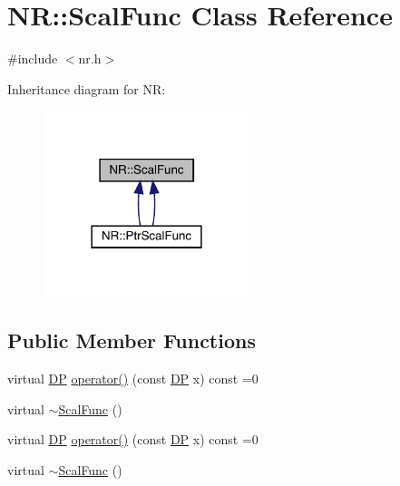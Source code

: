 \hypertarget{classNR_1_1ScalFunc}{}\section{NR\+:\+:Scal\+Func Class Reference}
\label{classNR_1_1ScalFunc}


{\ttfamily \#include $<$nr.\+h$>$}



Inheritance diagram for NR\+:\nopagebreak
\begin{figure}[H]
\begin{center}
\leavevmode
\includegraphics[width=170pt]{d0/dbb/classNR_1_1ScalFunc__inherit__graph}
\end{center}
\end{figure}
\subsection*{Public Member Functions}
\begin{DoxyCompactItemize}
\item 
virtual \mbox{\hyperlink{namespaceNR_af6ff762dd605ff477b8e52387253a02a}{DP}} \mbox{\hyperlink{classNR_1_1ScalFunc_a7dae30ac413c03bb0acfae13b7abb57e}{operator()}} (const \mbox{\hyperlink{namespaceNR_af6ff762dd605ff477b8e52387253a02a}{DP}} x) const =0
\item 
virtual \mbox{\hyperlink{classNR_1_1ScalFunc_ab75a4be18bcfcdaaf5028b7f96f94cf0}{$\sim$\+Scal\+Func}} ()
\item 
virtual \mbox{\hyperlink{namespaceNR_af6ff762dd605ff477b8e52387253a02a}{DP}} \mbox{\hyperlink{classNR_1_1ScalFunc_a7dae30ac413c03bb0acfae13b7abb57e}{operator()}} (const \mbox{\hyperlink{namespaceNR_af6ff762dd605ff477b8e52387253a02a}{DP}} x) const =0
\item 
virtual \mbox{\hyperlink{classNR_1_1ScalFunc_ab75a4be18bcfcdaaf5028b7f96f94cf0}{$\sim$\+Scal\+Func}} ()
\end{DoxyCompactItemize}


